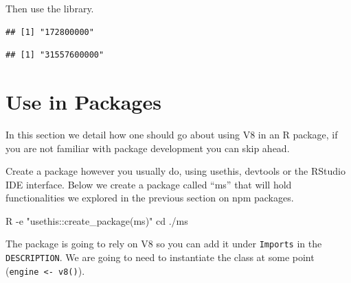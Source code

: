 \documentclass[
]{krantz}
\makeatletter
\newenvironment{Shaded}{\begin{snugshade}}{\end{snugshade}}
\newcommand{\BuiltInTok}[1]{#1}
\newcommand{\ExtensionTok}[1]{#1}
\newcommand{\KeywordTok}[1]{\textcolor[rgb]{0.27,0.27,0.27}{\textbf{#1}}}
\newcommand{\NormalTok}[1]{#1}
\newcommand{\OperatorTok}[1]{\textcolor[rgb]{0.43,0.43,0.43}{\textbf{#1}}}
\newcommand{\StringTok}[1]{\textcolor[rgb]{0.5,0.5,0.5}{#1}}
\newenvironment{kframe}{%
\medskip{}
\setlength{\fboxsep}{.8em}
 \def\at@end@of@kframe{}%
 \ifinner\ifhmode%
  \def\at@end@of@kframe{\end{minipage}}%
  \begin{minipage}{\columnwidth}%
 \fi\fi%
 \def\FrameCommand##1{\hskip\@totalleftmargin \hskip-\fboxsep
 \colorbox{shadecolor}{##1}\hskip-\fboxsep
     \hskip-\linewidth \hskip-\@totalleftmargin \hskip\columnwidth}%
 \MakeFramed {\advance\hsize-\width
   \@totalleftmargin\z@ \linewidth\hsize
   \@setminipage}}%
 {\par\unskip\endMakeFramed%
 \at@end@of@kframe}
\renewenvironment{Shaded}{\begin{kframe}}{\end{kframe}}
\makeatother
\begin{document}
Then use the library.

\begin{Shaded}
\end{Shaded}

\begin{verbatim}
## [1] "172800000"
\end{verbatim}

\begin{Shaded}
\end{Shaded}

\begin{verbatim}
## [1] "31557600000"
\end{verbatim}

\hypertarget{use-in-packages}{%
\section*{Use in Packages}\label{use-in-packages}}


In this section we detail how one should go about using V8 in an R package, if you are not familiar with package development you can skip ahead.

Create a package however you usually do, using usethis, devtools or the RStudio IDE interface. Below we create a package called ``ms'' that will hold functionalities we explored in the previous section on npm packages.

\begin{Shaded}
\begin{Highlighting}[]
\ExtensionTok{R}\NormalTok{ {-}e }\StringTok{"usethis::create\_package(\textquotesingle{}ms\textquotesingle{})"}
\BuiltInTok{cd}\NormalTok{ ./ms}
\end{Highlighting}
\end{Shaded}

The package is going to rely on V8 so you can add it under \texttt{Imports} in the \texttt{DESCRIPTION}. We are going to need to instantiate the class at some point (\texttt{engine\ \textless{}-\ v8()}).
\end{document}
